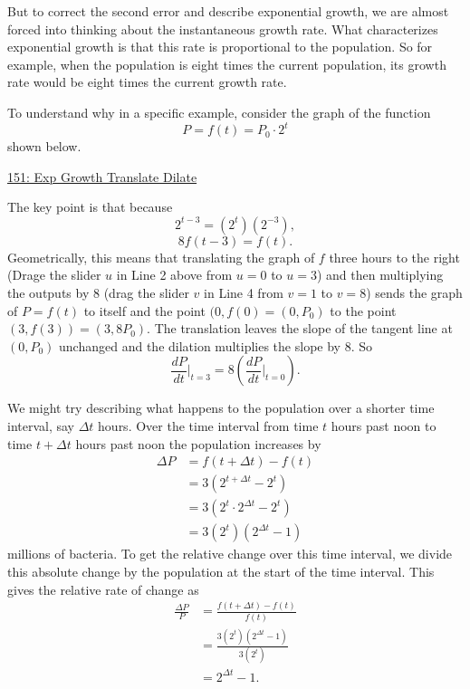 \documentclass{ximera}
\begin{document}
But to correct the second error and describe exponential growth, we are almost forced into thinking about the instantaneous growth rate. What characterizes exponential growth is that this rate is proportional to the population. So for example, when the population is eight times the current population, its growth rate would be eight times the current growth rate.

To understand why in a specific example, consider the graph of the function
\[
     P = f(t)  = P_0 \cdot 2^t  
\]
shown below. 

\href{https://www.desmos.com/calculator/dmdpvei3d6}{151: Exp Growth Translate Dilate} 
 
\begin{onlineOnly}
    \begin{center}
\end{center}
\end{onlineOnly}



The key point is that because
\[
 2^{t-3} = (2^t)(2^{-3}) , 
\]
\[
      8 f(t-3) = f(t).
\]
Geometrically, this means that translating the graph of $f$ three hours to the right (Drage the slider $u$ in Line 2 above from $u=0$ to $u=3$) and then multiplying the outputs by $8$ (drag the slider $v$ in Line 4 from $v=1$ to $v=8$) sends the graph of $P=f(t)$ to itself and the point $(0,f(0) = (0,P_0)$ to the point $(3,f(3)) = (3,8P_0)$. The translation leaves the slope of the tangent line at $(0,P_0)$ unchanged and the dilation multiplies the slope by $8$. So
\[
  \frac{dP}{dt}\Big|_{t=3} = 8 \left( \frac{dP}{dt}\Big|_{t=0} \right).
\]




We might try describing what happens to the population over a shorter time interval, say $\Delta t$ hours. Over the time interval from time $t$ hours past noon to time $t+\Delta t$ hours past noon the population increases by 
\begin{align*}
  \Delta P &=  f(t + \Delta t) - f(t)  \\ 
                               &=  3 (2^{t+\Delta t} - 2^t) \\
                               &=  3 (2^t \cdot 2^{\Delta t} - 2^t) \\
                               &=  3 (2^t) (2^{\Delta t} - 1) 
\end{align*}
millions of bacteria. To get the relative change over this time interval, we divide this absolute change by the population at the start of the time interval. This gives the relative rate of change as
\begin{align*}
   \frac{\Delta P}{P} &=  \frac{f(t + \Delta t) - f(t)}{f(t)}  \\ 
                              &= \frac{3 (2^t) (2^{\Delta t} - 1)}{3 (2^t)} \\
                              &= 2^{\Delta t} - 1.
\end{align*}
\end{document}

